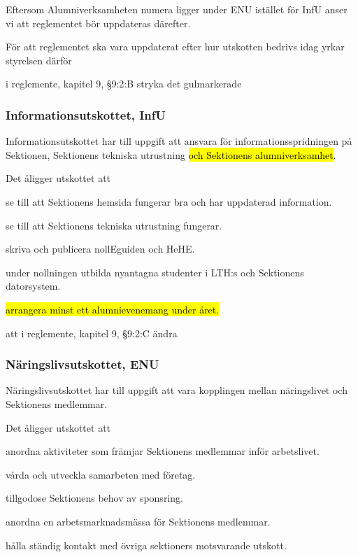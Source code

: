 \documentclass[../_main/handlingar.tex]{subfiles}
\begin{document}

Eftersom Alumniverksamheten numera ligger under ENU istället för InfU anser vi att reglementet bör uppdateras därefter.

För att reglementet ska vara uppdaterat efter hur utskotten bedrivs idag yrkar styrelsen därför


\begin{attsatser}
    \att i reglemente, kapitel 9, §9:2:B stryka det gulmarkerade
    \subsubsection{Informationsutskottet, InfU}
            Informationsutskottet har till uppgift att ansvara för informationsspridningen på Sektionen, Sektionens tekniska utrustning\hl{ och Sektionens alumniverksamhet}.

    Det åligger utskottet att
    \begin{tightdashlist}
    \item se till att Sektionens hemsida fungerar bra och har uppdaterad information.
    \item se till att Sektionens tekniska utrustning fungerar.
    \item skriva och publicera nollEguiden och HeHE.
    \item under nollningen utbilda nyantagna studenter i LTH:s och Sektionens datorsystem.
    \item \hl{arrangera minst ett alumnievenemang under året.}
    \end{tightdashlist}

    

att i reglemente, kapitel 9, §9:2:C ändra


\subsubsection{Näringslivsutskottet, ENU}
    Näringslivsutskottet har till uppgift att vara kopplingen mellan näringslivet och Sektionens medlemmar.

    Det åligger utskottet att
    \begin{tightdashlist}
    \item anordna aktiviteter som främjar Sektionens medlemmar inför arbetslivet.
    \item vårda och utveckla samarbeten med företag.
    \item tillgodose Sektionens behov av sponsring.
    \item anordna en arbetsmarknadsmässa för Sektionens medlemmar.
    \item hålla ständig kontakt med övriga sektioners motsvarande utskott.
    \end{tightdashlist} 



\end{attsatser}
\end{document}
